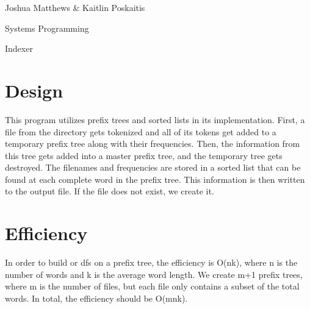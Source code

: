 \documentclass[letterpaper,12pt]{article}
\begin{document}
\noindent Joshua Matthews \& Kaitlin Poskaitis

\noindent Systems Programming

\noindent Indexer

\section*{Design}
This program utilizes prefix trees and sorted lists in its implementation.
First, a file from the directory gets tokenized and all of its tokens get added
to a temporary prefix tree along with their frequencies. Then, the information
from this tree gets added into a master prefix tree, and the temporary tree gets
destroyed.  The filenames and frequencies are stored in a sorted list that can be
found at each complete word in the prefix tree.  This information is then
written to the output file. If the file does not exist, we create it.

\section*{Efficiency}
In order to build or dfs on a prefix tree, the efficiency is O(nk), where n is
the number of words and k is the average word length.  We create m+1 prefix
trees, where m is the number of files, but each file only contains a subset of
the total words. In total, the efficiency should be O(mnk).
\end{document}

